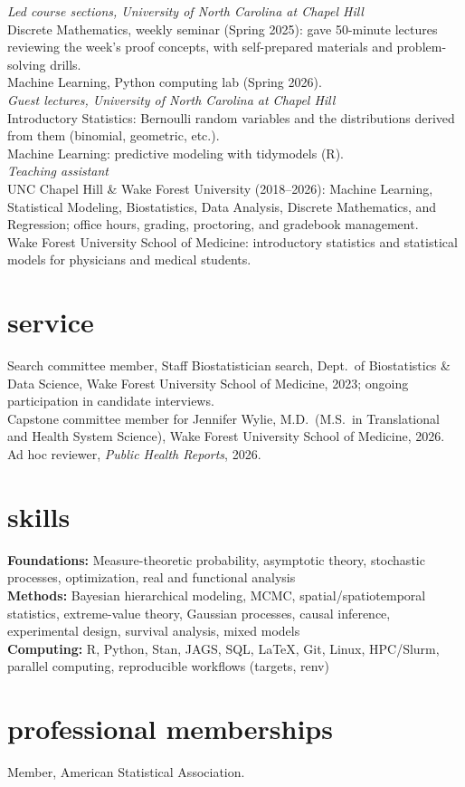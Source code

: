 \documentclass[11pt, letterpaper]{article}
\begin{document}
{\footnotesize
{\color{subtle}\itshape Led course sections, University of North Carolina at Chapel Hill} \\[2pt]
Discrete Mathematics, weekly seminar (Spring 2025): gave 50-minute lectures reviewing the week's proof concepts, with self-prepared materials and problem-solving drills. \\[2pt]
Machine Learning, Python computing lab (Spring 2026). \\[3pt]
{\color{subtle}\itshape Guest lectures, University of North Carolina at Chapel Hill} \\[2pt]
Introductory Statistics: Bernoulli random variables and the distributions derived from them (binomial, geometric, etc.). \\[2pt]
Machine Learning: predictive modeling with tidymodels (R). \\[3pt]
{\color{subtle}\itshape Teaching assistant} \\[2pt]
UNC Chapel Hill \& Wake Forest University (2018--2026): Machine Learning, Statistical Modeling, Biostatistics, Data Analysis, Discrete Mathematics, and Regression; office hours, grading, proctoring, and gradebook management. \\[2pt]
Wake Forest University School of Medicine: introductory statistics and statistical models for physicians and medical students.
}

\section{service}

{\footnotesize
Search committee member, Staff Biostatistician search, Dept.\ of Biostatistics \& Data Science, Wake Forest University School of Medicine, 2023; ongoing participation in candidate interviews. \\[2pt]
Capstone committee member for Jennifer Wylie, M.D.\ (M.S.\ in Translational and Health System Science), Wake Forest University School of Medicine, 2026. \\[2pt]
Ad hoc reviewer, \emph{Public Health Reports}, 2026.
}

\section{skills}

{\small
\textbf{Foundations:} Measure-theoretic probability, asymptotic theory, stochastic processes, optimization, real and functional analysis \\[1pt]
\textbf{Methods:} Bayesian hierarchical modeling, MCMC, spatial/spatiotemporal statistics, extreme-value theory, Gaussian processes, causal inference, experimental design, survival analysis, mixed models \\[1pt]
\textbf{Computing:} R, Python, Stan, JAGS, SQL, \LaTeX, Git, Linux, HPC/Slurm, parallel computing, reproducible workflows (targets, renv)
}

\section{professional memberships}

{\footnotesize
Member, American Statistical Association.
}

\vspace{6pt}
\end{document}
